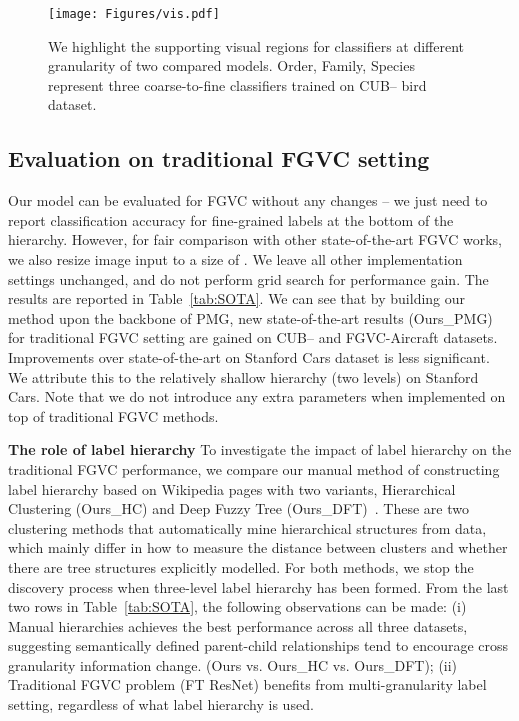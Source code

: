 \documentclass[final]{cvpr}
\newcommand{\keypoint}[1]{\vspace{0.05cm}\noindent\textbf{#1}\quad}
\begin{document}
\begin{figure*}[t]
\begin{center}
\texttt{[image: Figures/vis.pdf]}
\end{center}

  \caption{We highlight the supporting visual regions for classifiers at different granularity of two compared models. Order, Family, Species represent three coarse-to-fine classifiers trained on CUB-- bird dataset.}
\label{fig:vis}
\vspace{-5mm}
\end{figure*}


\subsection{Evaluation on traditional FGVC setting}
Our model can be evaluated for FGVC without any changes -- we just need to report classification accuracy for fine-grained labels at the bottom of the hierarchy. However, for fair comparison with other state-of-the-art FGVC works, we also resize image input to a size of   . We leave all other implementation settings unchanged, and do not perform grid search for performance gain. The results are reported in Table~\ref{tab:SOTA}. We can see that by building our method upon the backbone of PMG, new state-of-the-art results (Ours\_PMG) for traditional FGVC setting are gained on CUB-- and FGVC-Aircraft datasets. Improvements over state-of-the-art on Stanford Cars dataset is less significant. We attribute this to the relatively shallow hierarchy (two levels) on Stanford Cars. Note that we do not introduce any extra parameters when implemented on top of traditional FGVC methods. 


\keypoint{The role of label hierarchy}  To investigate the impact of label hierarchy on the traditional FGVC performance, we compare our manual method of constructing label hierarchy based on Wikipedia pages with two variants, Hierarchical Clustering (Ours\_HC) and Deep Fuzzy Tree (Ours\_DFT)~\cite{wang2019deep}. These are two clustering methods that automatically mine hierarchical structures from data, which mainly differ in how to measure the distance between clusters and whether there are tree structures explicitly modelled. For both methods, we stop the discovery process when three-level label hierarchy has been formed. From the last two rows in Table~\ref{tab:SOTA}, the following observations can be made: (i) Manual hierarchies achieves the best performance across all three datasets, suggesting semantically defined parent-child relationships tend to encourage cross granularity information change. (Ours vs. Ours\_HC vs. Ours\_DFT); (ii) Traditional FGVC problem (FT ResNet) benefits from multi-granularity label setting, regardless of what label hierarchy is used.
\end{document}
